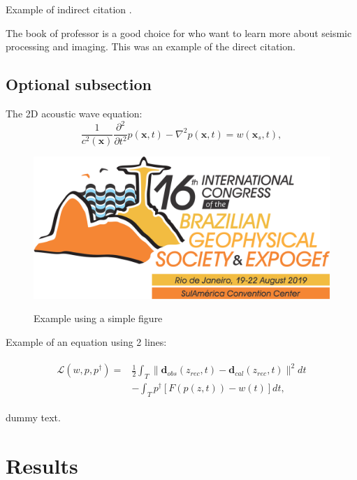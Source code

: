 \documentclass[twoside,letterpaper,twocolumn]{article}
\begin{document}
Example of indirect citation \citep{Yilmaz2000}.

The book of professor \cite{Claerbout1984} is a good choice for who want to learn more about seismic processing and imaging. This was an example of the direct citation.


\subsection{Optional subsection}
\lipsum[7]

The 2D acoustic wave equation:
\begin{equation}\label{waveequation}
\frac{ 1}{  c^2(\mathbf{x})}\frac{\partial^2}{\partial t^2}p(\mathbf{x},t) - \nabla^2 p(\mathbf{x},t)  = w(\mathbf{x}_s,t),				
\end{equation}

\noindent
\lipsum[8]

\begin{figure}[h!]
	\centering
	\includegraphics[width=0.9\linewidth]{images/logo_congress}
	\label{fig:label4}	
	\caption{Example using a simple figure}
\end{figure}

\lipsum[8]
Example of an equation using 2 lines:

\begin{eqnarray}\label{unconstrainedLagrangian}
 \begin{array}{rl}
\mathcal{L}(w,p,p^{\dagger}) = &\displaystyle \frac{1}{2}\int_{T} \| \mathbf{d}_{obs}(z_{rec},t) - \mathbf{d}_{cal}(z_{rec},t) \|^2 dt \\
                               &\displaystyle - \int_{T}p^{\dagger}\left[ F\left(p(z,t)\right) - w(t) \right] dt ,
\end{array}   
\end{eqnarray}

\noindent
dummy text.

\lipsum[9]
\section{Results}
\end{document}
